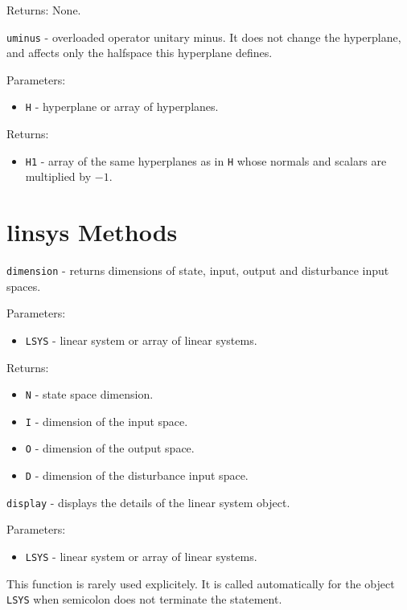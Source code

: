 \documentclass{report}
\begin{document}
Returns: None.

\newpage

{\Large {\tt uminus}} - overloaded operator unitary minus. It does not change
the hyperplane, and affects only the halfspace this hyperplane defines.

Parameters:
\begin{itemize}
\item {\tt H} - hyperplane or array of hyperplanes.
\end{itemize}

Returns:
\begin{itemize}
\item {\tt H1} - array of the same hyperplanes as in {\tt H} whose normals and
scalars are multiplied by $-1$.
\end{itemize}



\newpage

\section{linsys Methods}
{\Large {\tt dimension}} - returns dimensions of state, input, output and
disturbance input spaces.

Parameters:
\begin{itemize}
\item {\tt LSYS} - linear system or array of linear systems.
\end{itemize}

Returns:
\begin{itemize}
\item {\tt N} - state space dimension.
\item {\tt I} - dimension of the input space.
\item {\tt O} - dimension of the output space.
\item {\tt D} - dimension of the disturbance input space.
\end{itemize}

\newpage

{\Large {\tt display}} - displays the details of the linear system object.

Parameters:
\begin{itemize}
\item {\tt LSYS} - linear system or array of linear systems.
\end{itemize}
This function is rarely used explicitely. It is called automatically
for the object {\tt LSYS} when semicolon does not terminate the statement.
\end{document}
